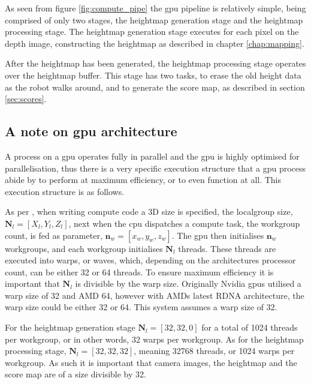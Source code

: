        \noindent
        As seen from figure \ref{fig:compute_pipe} the \ac{gpu} pipeline is relatively simple, being comprised of only two stages, the heightmap generation
        stage and the heightmap processing stage. The heightmap generation stage executes for each pixel on the depth image, constructing the heightmap as 
        described in chapter \ref{chap:mapping}.
        
        After the heightmap has been generated, the heightmap processing stage operates over the heightmap buffer. This stage has two tasks, to erase the
        old height data as the robot walks around, and to generate the score map, as described in section \ref{sec:scores}.
        
        \subsection{A note on \ac{gpu} architecture}
            A process on a \ac{gpu} operates fully in parallel and the \ac{gpu} is highly optimised for parallelisation, thus there is a very specific
            execution structure that a \ac{gpu} process abide by to perform at maximum efficiency, or to even function at all. This execution structure is
            as follows.
            
            As per \cite{nvidia_doc}, when writing compute code a 3D size is specified, the localgroup size, \(\bm{N}_{l} = [X_l,Y_{l},Z_{l}]\), next when the \ac{cpu} dispatches
            a compute task, the workgroup count, is fed as parameter, \(\bm{n}_{w} = [x_{w},y_{w},z_{w}]\). The \ac{gpu} then initialises
            \(\bm{n}_w\) workgroups, and each workgroup initialises \(\bm{N}_l\) threads. These threads are executed into warps, or waves, which, depending on the architectures processor count,
            can be either 32 or 64 threads. To ensure maximum efficiency it is important that \(\bm{N}_l\) is divisible by the warp size.
            Originally Nvidia \ac{gpu}s utilised a warp size of 32 and AMD 64, however with AMDs latest RDNA architecture, the warp size could be either 32 or 64.
            This system assumes a warp size of 32.
            
            For the heightmap generation stage \(\bm{N}_{l} = [32,32,0]\) for a total of 1024 threads per workgroup, or in other words, 32 warps per workgroup.
            As for the heightmap processing stage, \(\bm{N}_{l} = [32,32,32]\), meaning 32768 threads, or 1024 warps per workgroup.
            As such it is important that camera images, the heightmap and the score map are of a size divisible by 32.
        
